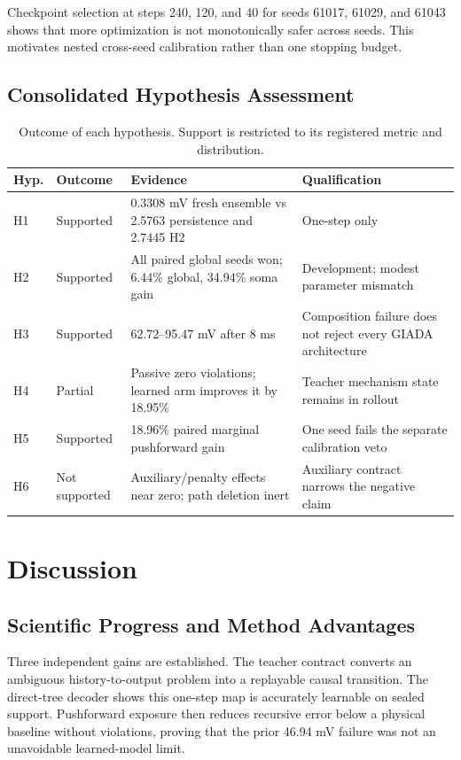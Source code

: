 \documentclass[11pt]{article}
\begin{document}
Checkpoint selection at steps 240, 120, and 40 for seeds 61017, 61029, and
61043 shows that more optimization is not monotonically safer across seeds.
This motivates nested cross-seed calibration rather than one stopping budget.

\subsection{Consolidated Hypothesis Assessment}

\begin{table}[t]
\centering
\caption{Outcome of each hypothesis. Support is restricted to its registered
metric and distribution.}
\label{tab:hypothesis-results}
\small
\begin{tabularx}{\textwidth}{p{0.8cm}p{2.1cm}YY}
\toprule
Hyp. & Outcome & Evidence & Qualification \\
\midrule
H1 & Supported & 0.3308 mV fresh ensemble vs 2.5763 persistence and 2.7445 H2
& One-step only \\
H2 & Supported & All paired global seeds won; 6.44\% global, 34.94\% soma gain
& Development; modest parameter mismatch \\
H3 & Supported & 62.72--95.47 mV after 8 ms & Composition failure does not
reject every GIADA architecture \\
H4 & Partial & Passive zero violations; learned arm improves it by 18.95\% &
Teacher mechanism state remains in rollout \\
H5 & Supported & 18.96\% paired marginal pushforward gain & One seed fails the
separate calibration veto \\
H6 & Not supported & Auxiliary/penalty effects near zero; path deletion inert &
Auxiliary contract narrows the negative claim \\
\bottomrule
\end{tabularx}
\end{table}

\section{Discussion}

\subsection{Scientific Progress and Method Advantages}

Three independent gains are established. The teacher contract converts an
ambiguous history-to-output problem into a replayable causal transition. The
direct-tree decoder shows this one-step map is accurately learnable on sealed
support. Pushforward exposure then reduces recursive error below a physical
baseline without violations, proving that the prior 46.94 mV failure was not
an unavoidable learned-model limit.
\end{document}
